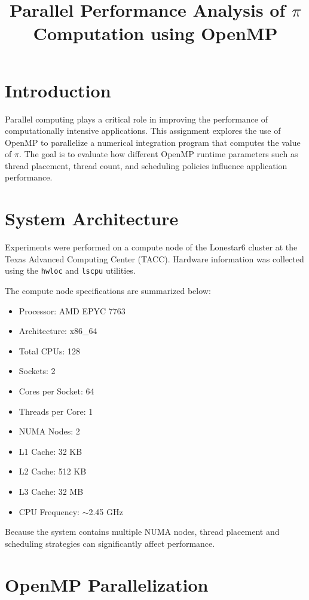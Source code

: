 \documentclass[conference]{IEEEtran}
\title{Parallel Performance Analysis of $\pi$ Computation using OpenMP}
\author{
\IEEEauthorblockN{Vinaykumar Reddy Junuthula}
\IEEEauthorblockA{CS 7334.251: HPC@Scale\\
Texas State University}
}
\begin{document}
\maketitle

\section{Introduction}

Parallel computing plays a critical role in improving the performance of computationally intensive applications. 
This assignment explores the use of OpenMP to parallelize a numerical integration program that computes the value of $\pi$. 
The goal is to evaluate how different OpenMP runtime parameters such as thread placement, thread count, and scheduling policies influence application performance.

\section{System Architecture}

Experiments were performed on a compute node of the Lonestar6 cluster at the Texas Advanced Computing Center (TACC). 
Hardware information was collected using the \texttt{hwloc} and \texttt{lscpu} utilities.

The compute node specifications are summarized below:

\begin{itemize}
\item Processor: AMD EPYC 7763
\item Architecture: x86\_64
\item Total CPUs: 128
\item Sockets: 2
\item Cores per Socket: 64
\item Threads per Core: 1
\item NUMA Nodes: 2
\item L1 Cache: 32 KB
\item L2 Cache: 512 KB
\item L3 Cache: 32 MB
\item CPU Frequency: $\sim$2.45 GHz
\end{itemize}

Because the system contains multiple NUMA nodes, thread placement and scheduling strategies can significantly affect performance.

\section{OpenMP Parallelization}
\end{document}
